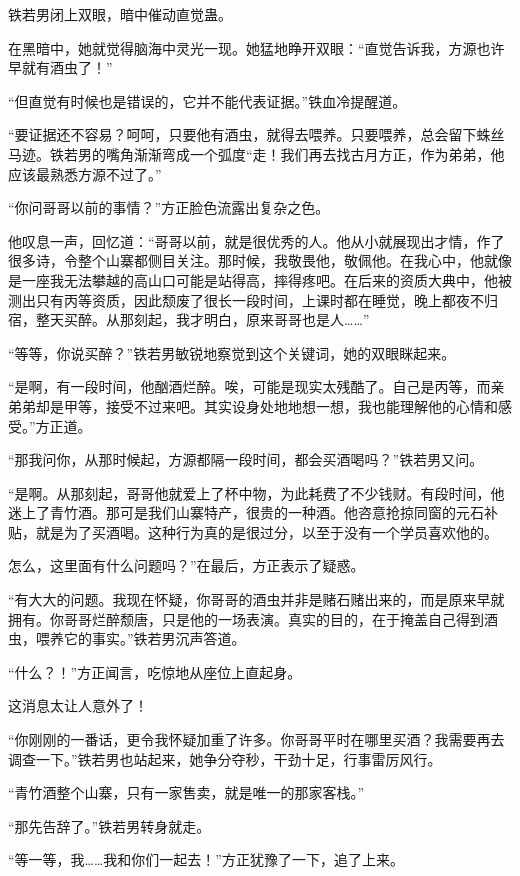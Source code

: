 \begin{this_body}
铁若男闭上双眼，暗中催动直觉蛊。

在黑暗中，她就觉得脑海中灵光一现。她猛地睁开双眼：“直觉告诉我，方源也许早就有酒虫了！”

“但直觉有时候也是错误的，它并不能代表证据。”铁血冷提醒道。

“要证据还不容易？呵呵，只要他有酒虫，就得去喂养。只要喂养，总会留下蛛丝马迹。铁若男的嘴角渐渐弯成一个弧度“走！我们再去找古月方正，作为弟弟，他应该最熟悉方源不过了。”

“你问哥哥以前的事情？”方正脸色流露出复杂之色。

他叹息一声，回忆道：“哥哥以前，就是很优秀的人。他从小就展现出才情，作了很多诗，令整个山寨都侧目关注。那时候，我敬畏他，敬佩他。在我心中，他就像是一座我无法攀越的高山口可能是站得高，摔得疼吧。在后来的资质大典中，他被测出只有丙等资质，因此颓废了很长一段时间，上课时都在睡觉，晚上都夜不归宿，整天买醉。从那刻起，我才明白，原来哥哥也是人……”

“等等，你说买醉？”铁若男敏锐地察觉到这个关键词，她的双眼眯起来。

“是啊，有一段时间，他酗酒烂醉。唉，可能是现实太残酷了。自己是丙等，而亲弟弟却是甲等，接受不过来吧。其实设身处地地想一想，我也能理解他的心情和感受。”方正道。

“那我问你，从那时候起，方源都隔一段时间，都会买酒喝吗？”铁若男又问。

“是啊。从那刻起，哥哥他就爱上了杯中物，为此耗费了不少钱财。有段时间，他迷上了青竹酒。那可是我们山寨特产，很贵的一种酒。他咨意抢掠同窗的元石补贴，就是为了买酒喝。这种行为真的是很过分，以至于没有一个学员喜欢他的。

怎么，这里面有什么问题吗？”在最后，方正表示了疑惑。

“有大大的问题。我现在怀疑，你哥哥的酒虫并非是赌石赌出来的，而是原来早就拥有。你哥哥烂醉颓唐，只是他的一场表演。真实的目的，在于掩盖自己得到酒虫，喂养它的事实。”铁若男沉声答道。

“什么？！”方正闻言，吃惊地从座位上直起身。

这消息太让人意外了！

“你刚刚的一番话，更令我怀疑加重了许多。你哥哥平时在哪里买酒？我需要再去调查一下。”铁若男也站起来，她争分夺秒，干劲十足，行事雷厉风行。

“青竹酒整个山寨，只有一家售卖，就是唯一的那家客栈。”

“那先告辞了。”铁若男转身就走。

“等一等，我……我和你们一起去！”方正犹豫了一下，追了上来。


\end{this_body}
